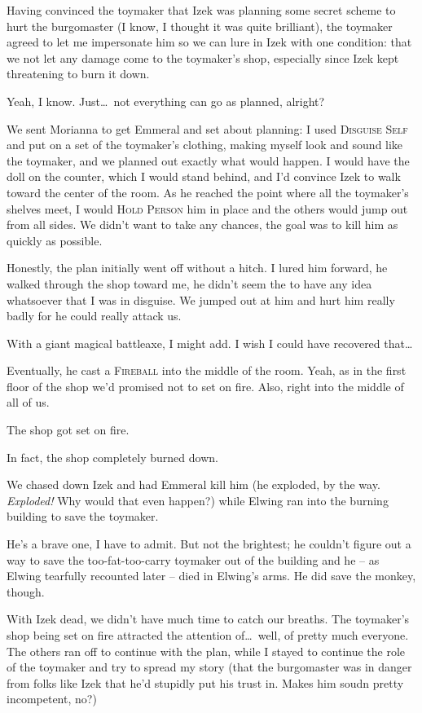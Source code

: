 Having convinced the toymaker that Izek was planning some secret scheme to hurt the burgomaster (I know, I thought it was quite brilliant), the toymaker agreed to let me impersonate him so we can lure in Izek with one condition: that we not let any damage come to the toymaker's shop, especially since Izek kept threatening to burn it down.

Yeah, I know. Just\dots\ not everything can go as planned, alright?

We sent Morianna to get Emmeral and set about planning: I used \textsc{Disguise Self} and put on a set of the toymaker's clothing, making myself look and sound like the toymaker, and we planned out exactly what would happen. I would have the doll on the counter, which I would stand behind, and I'd convince Izek to walk toward the center of the room. As he reached the point where all the toymaker's shelves meet, I would \textsc{Hold Person} him in place and the others would jump out from all sides. We didn't want to take any chances, the goal was to kill him as quickly as possible.

Honestly, the plan initially went off without a hitch. I lured him forward, he walked through the shop toward me, he didn't seem the to have any idea whatsoever that I was in disguise. We jumped out at him and hurt him really badly for he could really attack us.

With a giant magical battleaxe, I might add. I wish I could have recovered that\dots

Eventually, he cast a \textsc{Fireball} into the middle of the room. Yeah, as in the first floor of the shop we'd promised not to set on fire. Also, right into the middle of all of us.

The shop got set on fire.

In fact, the shop completely burned down.

We chased down Izek and had Emmeral kill him (he exploded, by the way. \emph{Exploded!} Why would that even happen?) while Elwing ran into the burning building to save the toymaker.

He's a brave one, I have to admit. But not the brightest; he couldn't figure out a way to save the too-fat-too-carry toymaker out of the building and he -- as Elwing tearfully recounted later -- died in Elwing's arms. He did save the monkey, though.

With Izek dead, we didn't have much time to catch our breaths. The toymaker's shop being set on fire attracted the attention of\dots\ well, of pretty much everyone. The others ran off to continue with the plan, while I stayed to continue the role of the toymaker and try to spread my story (that the burgomaster was in danger from folks like Izek that he'd stupidly put his trust in. Makes him soudn pretty incompetent, no?)

